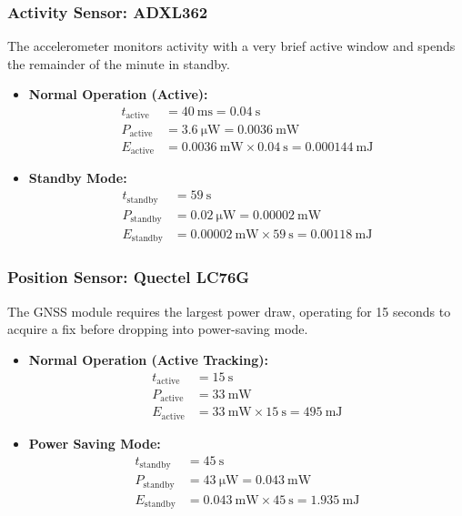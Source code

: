 \documentclass[paper=a4]{article}
\begin{document}
\subsubsection{Activity Sensor: ADXL362}
The accelerometer monitors activity with a very brief active window and spends the remainder of the minute in standby.
\begin{itemize}
    \item \textbf{Normal Operation (Active):}
    \begin{align*}
        t_{\text{active}} &= \SI{40}{\milli\second} = \SI{0.04}{\second} \\
        P_{\text{active}} &= \SI{3.6}{\micro\watt} = \SI{0.0036}{\milli\watt} \\
        E_{\text{active}} &= \SI{0.0036}{\milli\watt} \times \SI{0.04}{\second} = \SI{0.000144}{\milli\joule}
    \end{align*}
    
    \item \textbf{Standby Mode:}
    \begin{align*}
        t_{\text{standby}} &= \SI{59}{\second} \\
        P_{\text{standby}} &= \SI{0.02}{\micro\watt} = \SI{0.00002}{\milli\watt} \\
        E_{\text{standby}} &= \SI{0.00002}{\milli\watt} \times \SI{59}{\second} = \SI{0.00118}{\milli\joule}
    \end{align*}
\end{itemize}

\subsubsection{Position Sensor: Quectel LC76G}
The GNSS module requires the largest power draw, operating for 15 seconds to acquire a fix before dropping into power-saving mode.
\begin{itemize}
    \item \textbf{Normal Operation (Active Tracking):}
    \begin{align*}
        t_{\text{active}} &= \SI{15}{\second} \\
        P_{\text{active}} &= \SI{33}{\milli\watt} \\
        E_{\text{active}} &= \SI{33}{\milli\watt} \times \SI{15}{\second} = \SI{495}{\milli\joule}
    \end{align*}
    
    \item \textbf{Power Saving Mode:}
    \begin{align*}
        t_{\text{standby}} &= \SI{45}{\second} \\
        P_{\text{standby}} &= \SI{43}{\micro\watt} = \SI{0.043}{\milli\watt} \\
        E_{\text{standby}} &= \SI{0.043}{\milli\watt} \times \SI{45}{\second} = \SI{1.935}{\milli\joule}
    \end{align*}
\end{itemize}
\end{document}
